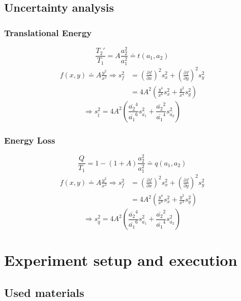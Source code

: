 \documentclass{scrreprt}
\begin{document}
\subsection{Uncertainty analysis}
\subsubsection{Translational Energy}
\begin{equation}
\frac{T_2'}{T_1}=A\frac{a_2^2}{a_1^2}\doteq t(a_1,a_2)
\end{equation}
\begin{align}
f(x,y) \doteq A\frac{y^2}{x^2} \Longrightarrow
s_f^2 &= \left(\frac{\partial f}{\partial x}\right)^2 s_x^2 + \left(\frac{\partial f}{\partial y}\right)^2 s_y^2\\
&= 4 A^2 \left( \frac{y^4}{x^6} s_x^2 + \frac{y^2}{x^4} s_y^2 \right)
\end{align}
\begin{equation}
\Longrightarrow s_{\bar{t}}^2 = 4 A^2 \left(\frac{\overline{a_2}^4}{\overline{a_1}^6} s_{\overline{a_1}}^2 + \frac{\overline{a_2}^2}{\overline{a_1}^4} s_{\overline{a_2}}^2 \right)
\end{equation}

\subsubsection{Energy Loss}
\begin{equation}
\frac{Q}{T_1}= 1-(1+A) \frac{a_2^2}{a_1^2} \doteq q(a_1,a_2)
\end{equation}
\begin{align}
f(x,y) \doteq A\frac{y^2}{x^2} \Longrightarrow
s_f^2 &= \left(\frac{\partial f}{\partial x}\right)^2 s_x^2 + \left(\frac{\partial f}{\partial y}\right)^2 s_y^2\\
&= 4 A^2 \left( \frac{y^4}{x^6} s_x^2 + \frac{y^2}{x^4} s_y^2 \right)
\end{align}
\begin{equation}
\Longrightarrow s_{\bar{q}}^2 = 4 A^2 \left(\frac{\overline{a_2}^4}{\overline{a_1}^6} s_{\overline{a_1}}^2 + \frac{\overline{a_2}^2}{\overline{a_1}^4} s_{\overline{a_2}}^2 \right)
\end{equation}

\section{Experiment setup and execution}

\subsection{Used materials}
\end{document}
